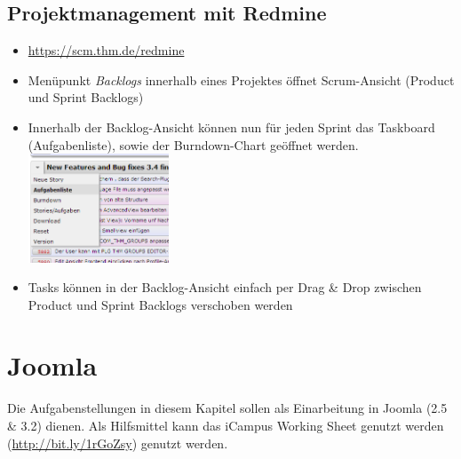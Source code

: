 \documentclass[]{article}
\begin{document}
\subsection{Projektmanagement mit Redmine}
\begin{itemize}
\item \url{https://scm.thm.de/redmine}
\item Menüpunkt \textit{Backlogs} innerhalb eines Projektes öffnet Scrum-Ansicht (Product und Sprint Backlogs)
\item Innerhalb der Backlog-Ansicht können nun für jeden Sprint das Taskboard (Aufgabenliste), sowie der Burndown-Chart geöffnet werden.\\
\includegraphics[width=0.33\textwidth]{Backlogs.png}
\item Tasks können in der Backlog-Ansicht einfach per Drag \& Drop zwischen Product und Sprint Backlogs verschoben werden
\end{itemize}
\section{Joomla}
Die Aufgabenstellungen in diesem Kapitel sollen als Einarbeitung in Joomla (2.5 \& 3.2) dienen. Als Hilfsmittel kann das iCampus Working Sheet genutzt werden (\url{http://bit.ly/1rGoZsy}) genutzt werden. 
\end{document}
